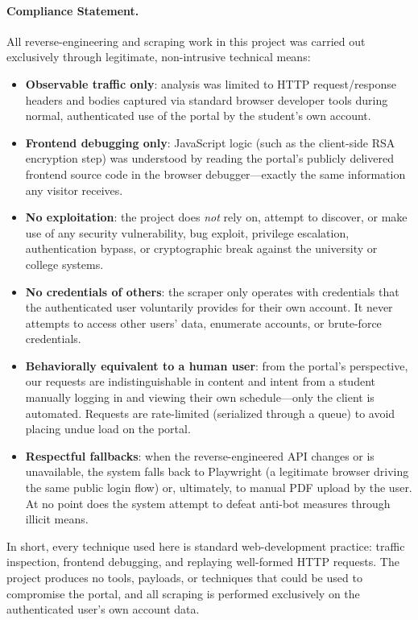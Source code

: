 \documentclass[12pt,a4paper]{article}
\begin{document}
\paragraph{Compliance Statement.}
All reverse-engineering and scraping work in this project was carried out exclusively through legitimate, non-intrusive technical means:
\begin{itemize}[nosep]
    \item \textbf{Observable traffic only}: analysis was limited to HTTP request/response headers and bodies captured via standard browser developer tools during normal, authenticated use of the portal by the student's own account.
    \item \textbf{Frontend debugging only}: JavaScript logic (such as the client-side RSA encryption step) was understood by reading the portal's publicly delivered frontend source code in the browser debugger---exactly the same information any visitor receives.
    \item \textbf{No exploitation}: the project does \emph{not} rely on, attempt to discover, or make use of any security vulnerability, bug exploit, privilege escalation, authentication bypass, or cryptographic break against the university or college systems.
    \item \textbf{No credentials of others}: the scraper only operates with credentials that the authenticated user voluntarily provides for their own account. It never attempts to access other users' data, enumerate accounts, or brute-force credentials.
    \item \textbf{Behaviorally equivalent to a human user}: from the portal's perspective, our requests are indistinguishable in content and intent from a student manually logging in and viewing their own schedule---only the client is automated. Requests are rate-limited (serialized through a queue) to avoid placing undue load on the portal.
    \item \textbf{Respectful fallbacks}: when the reverse-engineered API changes or is unavailable, the system falls back to Playwright (a legitimate browser driving the same public login flow) or, ultimately, to manual PDF upload by the user. At no point does the system attempt to defeat anti-bot measures through illicit means.
\end{itemize}

In short, every technique used here is standard web-development practice: traffic inspection, frontend debugging, and replaying well-formed HTTP requests. The project produces no tools, payloads, or techniques that could be used to compromise the portal, and all scraping is performed exclusively on the authenticated user's own account data.
\end{document}
